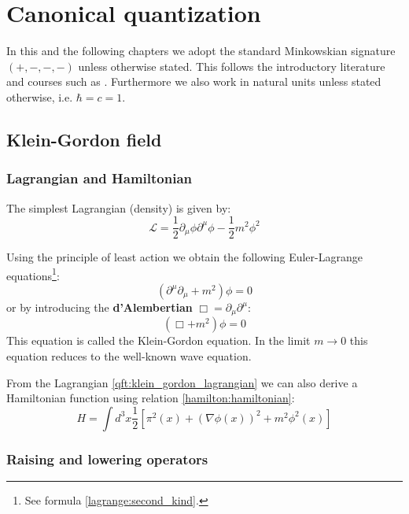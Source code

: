 \chapter{Canonical quantization}

	In this and the following chapters we adopt the standard Minkowskian signature $(+, -, -, -)$ unless otherwise stated. This follows the introductory literature and courses such as \cite{Peskin}. Furthermore we also work in natural units unless stated otherwise, i.e. $\hbar = c = 1$.

\section{Klein-Gordon field}
\subsection{Lagrangian and Hamiltonian}

	The simplest Lagrangian (density) is given by:
	\begin{equation}
		\label{qft:klein_gordon_lagrangian}
		\boxed{\mathcal{L} = \frac{1}{2}\partial_\mu\phi\partial^\mu\phi - \frac{1}{2}m^2\phi^2}
	\end{equation}
	
	Using the principle of least action we obtain the following Euler-Lagrange equations\footnote{See formula \ref{lagrange:second_kind}.}:
	\begin{equation}
		\left(\partial^\mu\partial_\mu + m^2\right)\phi = 0
	\end{equation}
	or by introducing the \textbf{d'Alembertian} $\Box = \partial_\mu\partial^\mu$:
	\begin{equation}
		\label{qft:klein_gordon_equation}
		\boxed{(\Box+m^2)\phi = 0}
	\end{equation}
	This equation is called the Klein-Gordon equation. In the limit $m\rightarrow0$ this equation reduces to the well-known wave equation.
	
	From the Lagrangian \ref{qft:klein_gordon_lagrangian} we can also derive a Hamiltonian function using relation \ref{hamilton:hamiltonian}:
	\begin{equation}
		\label{qft:klein_gordon_hamiltonian}
		\boxed{H = \int d^3x \frac{1}{2}\left[\pi^2(x) + (\nabla\phi(x))^2 + m^2\phi^2(x)\right]}
	\end{equation}
	
	
\subsection{Raising and lowering operators}

